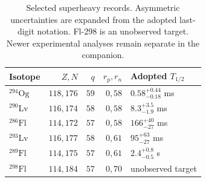 \begin{table}[htbp]
\centering\small
\begin{tabular}{lrrrl}
\toprule
Isotope & $Z,N$ & $q$ & $r_p,r_n$ & Adopted $T_{1/2}$ \\
\midrule
$^{294}\mathrm{Og}$ & $118,176$ & $59$ & $0,58$ & $0.58^{+0.44}_{-0.18}$ ms \\
$^{290}\mathrm{Lv}$ & $116,174$ & $58$ & $0,58$ & $8.3^{+3.5}_{-1.9}$ ms \\
$^{286}\mathrm{Fl}$ & $114,172$ & $57$ & $0,58$ & $166^{+40}_{-27}$ ms \\
$^{293}\mathrm{Lv}$ & $116,177$ & $58$ & $0,61$ & $95^{+63}_{-27}$ ms \\
$^{289}\mathrm{Fl}$ & $114,175$ & $57$ & $0,61$ & $2.4^{+0.8}_{-0.5}$ s \\
$^{298}\mathrm{Fl}$ & $114,184$ & $57$ & $0,70$ & unobserved target \\
\bottomrule
\end{tabular}
\caption{Selected superheavy records. Asymmetric uncertainties are expanded from the adopted last-digit notation. Fl-298 is an unobserved target. Newer experimental analyses remain separate in the companion.}
\label{tab:isotope-superheavy}
\end{table}
